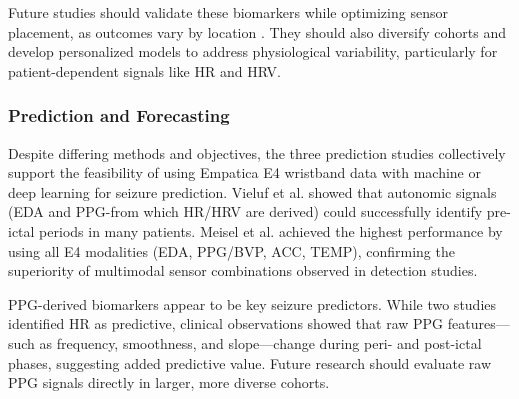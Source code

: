 Future studies should validate these biomarkers while optimizing sensor placement, as outcomes vary by location  \cite{Milosevic2016-ee,De_Cooman2018-pq}. They should also diversify cohorts and develop personalized models to address physiological variability, particularly for patient-dependent signals like HR and HRV.

\subsubsection{Prediction and Forecasting}
Despite differing methods and objectives, the three prediction studies collectively support the feasibility of using Empatica E4 wristband data with machine or deep learning for seizure prediction. Vieluf et al. \cite{Vieluf2023-ta,Vieluf2023-zv} showed that autonomic signals (EDA and PPG-from which HR/HRV are derived) could successfully identify pre-ictal periods in many patients. Meisel et al. \cite{Meisel2020-ii}achieved the highest performance by using all E4 modalities (EDA, PPG/BVP, ACC, TEMP), confirming the superiority of multimodal sensor combinations observed in detection studies.

PPG-derived biomarkers appear to be key seizure predictors. While two studies \cite{Vieluf2023-ta,Vieluf2023-zv} identified HR as predictive, clinical observations \cite{Mohammadpour_Touserkani2020-tk} showed that raw PPG features—such as frequency, smoothness, and slope—change during peri- and post-ictal phases, suggesting added predictive value. Future research should evaluate raw PPG signals directly in larger, more diverse cohorts.